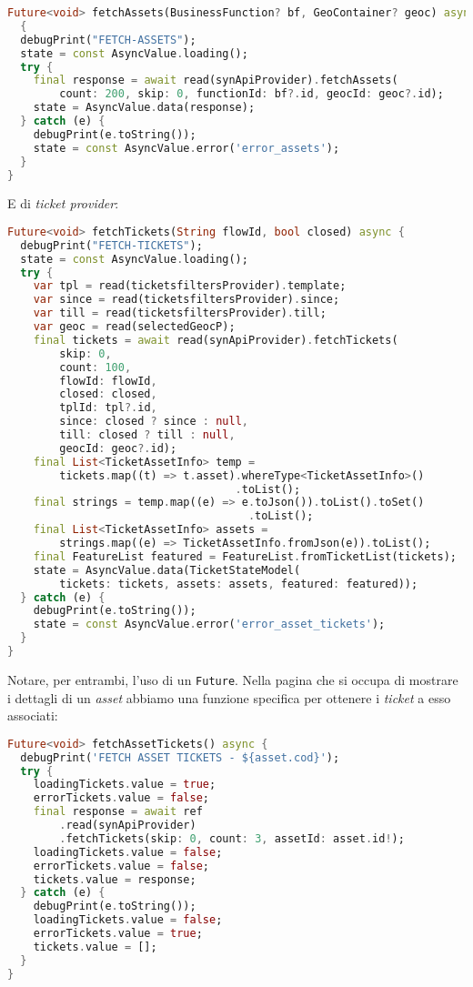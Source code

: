 \begin{lstlisting}[language=dart, label={lst:mobilesyn_asset_provider},firstnumber=1,caption={mobilesyn \textit{asset provider}}]
Future<void> fetchAssets(BusinessFunction? bf, GeoContainer? geoc) async 
  {
  debugPrint("FETCH-ASSETS");
  state = const AsyncValue.loading();
  try {
    final response = await read(synApiProvider).fetchAssets(
        count: 200, skip: 0, functionId: bf?.id, geocId: geoc?.id);
    state = AsyncValue.data(response);
  } catch (e) {
    debugPrint(e.toString());
    state = const AsyncValue.error('error_assets');
  }
}
\end{lstlisting} 

E di \textit{ticket provider}:

\begin{lstlisting}[language=dart, label={lst:mobilesyn_ticket_provider}, firstnumber=1,caption={mobilesyn \textit{ticket provider}}]
Future<void> fetchTickets(String flowId, bool closed) async {
  debugPrint("FETCH-TICKETS");
  state = const AsyncValue.loading();
  try {
    var tpl = read(ticketsfiltersProvider).template;
    var since = read(ticketsfiltersProvider).since;
    var till = read(ticketsfiltersProvider).till;
    var geoc = read(selectedGeocP);
    final tickets = await read(synApiProvider).fetchTickets(
        skip: 0,
        count: 100,
        flowId: flowId,
        closed: closed,
        tplId: tpl?.id,
        since: closed ? since : null,
        till: closed ? till : null,
        geocId: geoc?.id);
    final List<TicketAssetInfo> temp =
        tickets.map((t) => t.asset).whereType<TicketAssetInfo>()
                                   .toList();
    final strings = temp.map((e) => e.toJson()).toList().toSet()
                                     .toList();
    final List<TicketAssetInfo> assets =
        strings.map((e) => TicketAssetInfo.fromJson(e)).toList();
    final FeatureList featured = FeatureList.fromTicketList(tickets);
    state = AsyncValue.data(TicketStateModel(
        tickets: tickets, assets: assets, featured: featured));
  } catch (e) {
    debugPrint(e.toString());
    state = const AsyncValue.error('error_asset_tickets');
  }
}
\end{lstlisting} 

Notare, per entrambi, l'uso di un \verb+Future+. Nella pagina che si occupa di mostrare i dettagli di un \textit{asset} abbiamo una funzione specifica per ottenere i \textit{ticket} a esso associati:

\begin{lstlisting}[language=dart, label={lst:mobilesyn_asset_ticket_provider}, firstnumber=1,caption={mobilesyn \textit{asset ticket provider}}]
Future<void> fetchAssetTickets() async {
  debugPrint('FETCH ASSET TICKETS - ${asset.cod}');
  try {
    loadingTickets.value = true;
    errorTickets.value = false;
    final response = await ref
        .read(synApiProvider)
        .fetchTickets(skip: 0, count: 3, assetId: asset.id!);
    loadingTickets.value = false;
    errorTickets.value = false;
    tickets.value = response;
  } catch (e) {
    debugPrint(e.toString());
    loadingTickets.value = false;
    errorTickets.value = true;
    tickets.value = [];
  }
}
\end{lstlisting} 

